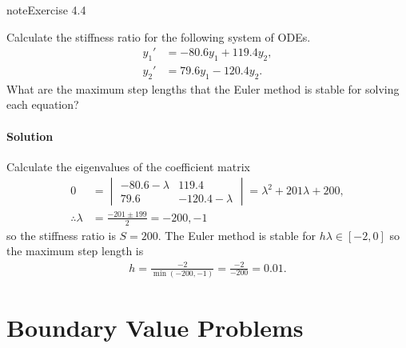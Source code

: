 \documentclass[letterpaper,10pt,english]{jupyterBook}
\begin{document}
\begin{sphinxadmonition}{note}{Exercise 4.4}

\sphinxAtStartPar
Calculate the stiffness ratio for the following system of ODEs.
\begin{align*}
    y_1' &= -80.6 y_1 + 119.4 y_2,\\
    y_2' &= 79.6 y_1 - 120.4 y_2.
\end{align*}
\sphinxAtStartPar
What are the maximum step lengths that the Euler method is stable for solving each equation?
\subsubsection*{Solution}

\sphinxAtStartPar
Calculate the eigenvalues of the coefficient matrix
\begin{align*}
    0 &= \begin{vmatrix} -80.6 - \lambda & 119.4 \\ 79.6 & -120.4 - \lambda \end{vmatrix}
    = \lambda^2 + 201 \lambda + 200, \\
    \therefore \lambda &= \frac{-201 \pm 199}{2} = -200, -1
\end{align*}
\sphinxAtStartPar
so the stiffness ratio is \(S = 200\). The Euler method is stable for \(h\lambda \in [-2, 0]\) so the maximum step length is
\begin{equation*}
\begin{split}h = \frac{-2}{\min(-200, -1)} = \frac{-2}{-200} = 0.01.\end{split}
\end{equation*}\end{sphinxadmonition}

\sphinxstepscope


\chapter{Boundary Value Problems}
\label{\detokenize{5_BVPs/5.0_BVPs:boundary-value-problems}}\label{\detokenize{5_BVPs/5.0_BVPs:bvp-chapter}}\label{\detokenize{5_BVPs/5.0_BVPs::doc}}
\sphinxAtStartPar
{}
\end{document}
